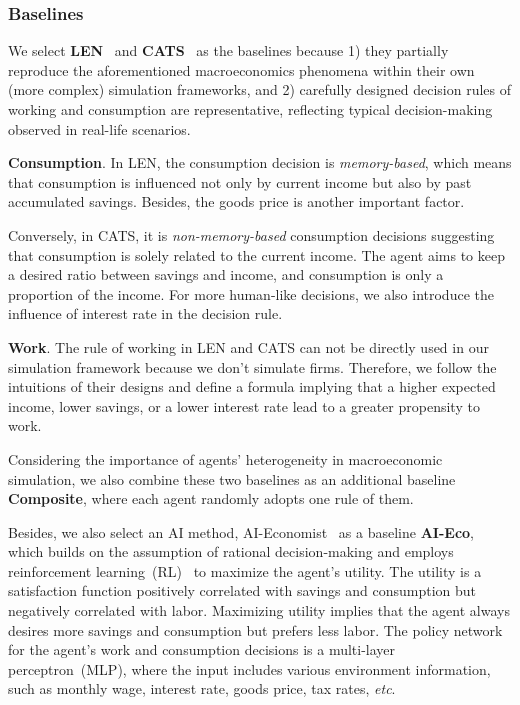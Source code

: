 
\subsubsection{Baselines} We select \textbf{LEN}~\cite{lengnick2013agent} and \textbf{CATS}~\cite{gatti2011macroeconomics} as the baselines because 1) they partially reproduce the aforementioned macroeconomics phenomena within their own (more complex) simulation frameworks, and 2) carefully designed decision rules of working and consumption are representative, reflecting typical decision-making observed in real-life scenarios.

\textbf{Consumption}. In LEN, the consumption decision is \textit{memory-based}, which means that consumption is influenced not only by current income but also by past accumulated savings. Besides, the goods price is another important factor. 

Conversely, in CATS, it is \textit{non-memory-based} consumption decisions suggesting that consumption is solely related to the current income. The agent aims to keep a desired ratio between savings and income, and consumption is only a proportion of the income. For more human-like decisions, we also introduce the influence of interest rate in the decision rule.

\textbf{Work}. The rule of working in LEN and CATS can not be directly used in our simulation framework because we don't simulate firms. Therefore, we follow the intuitions of their designs and define a formula implying that a higher expected income, lower savings, or a lower interest rate lead to a greater propensity to work.

Considering the importance of agents' heterogeneity in macroeconomic simulation, we also combine these two baselines as an additional baseline \textbf{Composite}, where each agent randomly adopts one rule of them.

Besides, we also select an AI method, AI-Economist~\cite{zheng2022ai} as a baseline \textbf{AI-Eco}, which builds on the assumption of rational decision-making and employs reinforcement learning~(RL)~\cite{arulkumaran2017deep} to maximize the agent's utility. The utility is a satisfaction function positively correlated with savings and consumption but negatively correlated with labor. Maximizing utility implies that the agent always desires more savings and consumption but prefers less labor. The policy network for the agent's work and consumption decisions is a multi-layer perceptron~(MLP), where the input includes various environment information, such as monthly wage, interest rate, goods price, tax rates, \textit{etc}.

